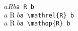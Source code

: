 \documentclass[crop]{standalone}
\begin{document}
\noindent
$a R b$\hfill\verb|a R b|\\[12pt]
\noindent
$a \mathrel{R} b$\hfill\verb|a \mathrel{R} b|\\[12pt]
\noindent
$a \mathop{R} b$\hfill\verb|a \mathop{R} b|\\[12pt]
\end{document}
